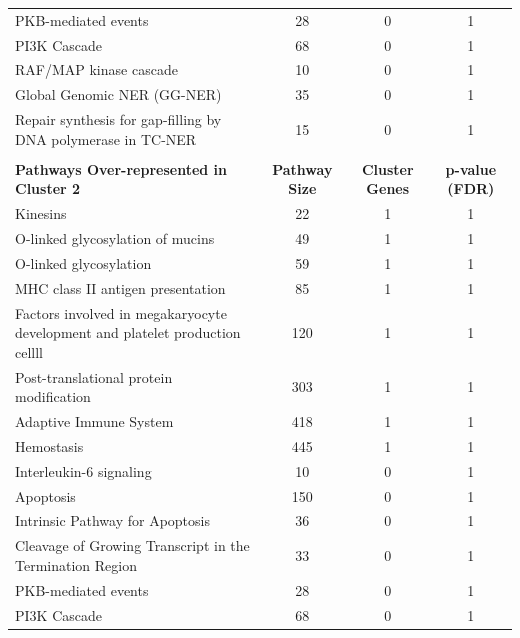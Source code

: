\begin{table}[!Hp]
{\begin{tabular}{lccc}
  \rowcolor{Cluster_Blue!15}
  PKB-mediated events &  28 &   0 &   1 \\ 
  \rowcolor{Cluster_Blue!20}
  PI3K Cascade &  68 &   0 &   1 \\ 
  \rowcolor{Cluster_Blue!15}
  RAF/MAP kinase cascade &  10 &   0 &   1 \\ 
  \rowcolor{Cluster_Blue!20}
  Global Genomic NER (GG-NER) &  35 &   0 &   1 \\ 
  \rowcolor{Cluster_Blue!15}
  Repair synthesis for gap-filling by DNA polymerase in TC-NER &  15 &   0 &   1 \\ 
  \hline
  \\
  \cellcolor{white} \large{\textbf{Pathways Over-represented in Cluster 2}} & \large{\textbf{Pathway Size}} & \large{\textbf{Cluster Genes}} & \large{\textbf{p-value (FDR)}} \\ %
  \hline
  \rowcolor{Cluster_Green!30}
  Kinesins &  22 &   1 &   1 \\ 
  \rowcolor{Cluster_Green!20}
  O-linked glycosylation of mucins &  49 &   1 &   1 \\ 
  \rowcolor{Cluster_Green!30}
  O-linked glycosylation &  59 &   1 &   1 \\ 
  \rowcolor{Cluster_Green!20}
  MHC class II antigen presentation &  85 &   1 &   1 \\ 
  \rowcolor{Cluster_Green!30}
  Factors involved in megakaryocyte development and platelet production \textcolor{Cluster_Green!30} {cellll} & 120 &   1 &   1 \\
  \rowcolor{Cluster_Green!20}
  Post-translational protein modification & 303 &   1 &   1 \\ 
  \rowcolor{Cluster_Green!30}
  Adaptive Immune System & 418 &   1 &   1 \\ 
  \rowcolor{Cluster_Green!20}
  Hemostasis & 445 &   1 &   1 \\ 
  \rowcolor{Cluster_Green!30}
  Interleukin-6 signaling &  10 &   0 &   1 \\ 
  \rowcolor{Cluster_Green!20}
  Apoptosis & 150 &   0 &   1 \\ 
  \rowcolor{Cluster_Green!30}
  Intrinsic Pathway for Apoptosis &  36 &   0 &   1 \\ 
  \rowcolor{Cluster_Green!20}
  Cleavage of Growing Transcript in the Termination Region &  33 &   0 &   1 \\ 
  \rowcolor{Cluster_Green!30}
  PKB-mediated events &  28 &   0 &   1 \\ 
  \rowcolor{Cluster_Green!20}
  PI3K Cascade &  68 &   0 &   1 \\ 

\end{tabular}}
\end{table}
